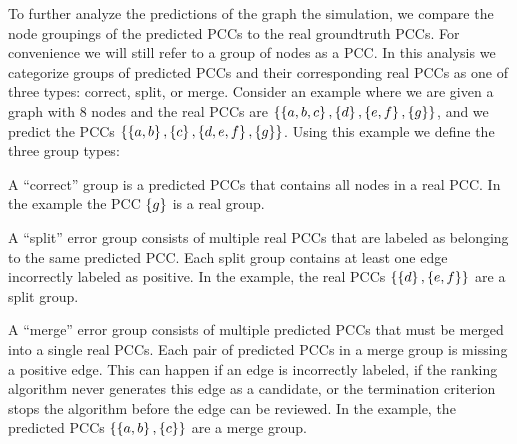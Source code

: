     To further analyze the predictions of the graph the simulation, we compare the node groupings of the
      predicted PCCs to the real groundtruth PCCs.
    For convenience we will still refer to a group of nodes as a PCC.
    In this analysis we categorize groups of predicted PCCs and their corresponding real PCCs as one of three
      types:
    correct, split, or merge.
    Consider an example where we are given a graph with $8$ nodes and the real PCCs are %
    $\left\{\left\{a, b, c\right\}, \left\{d\right\}, \left\{e, f\right\}, \left\{g\right\}\right\}$, and we predict the PCCs%
    $\left\{\left\{a, b\right\}, \left\{c\right\}, \left\{d, e, f\right\}, \left\{g\right\}\right\}$.
    Using this example we define the three group types:
    \begin{enumln}
        \item A ``correct'' group is a predicted PCCs that contains all nodes in a real PCC.
        In the example the PCC $\left\{g\right\}$ is a real group.
        
        \item A ``split'' error group consists of multiple real PCCs that are labeled as belonging to the same
          predicted PCC.
        Each split group contains at least one edge incorrectly labeled as positive.
        In the example, the real PCCs $\left\{\left\{d\right\}, \left\{e, f\right\}\right\}$ are a split group.
      
        \item A ``merge'' error group consists of multiple predicted PCCs that must be merged into a single real
          PCCs.
        Each pair of predicted PCCs in a merge group is missing a positive edge.
        This can happen if an edge is incorrectly labeled, if the ranking algorithm never generates this edge as
          a candidate, or the termination criterion stops the algorithm before the edge can be reviewed.
        In the example, the predicted PCCs $\left\{\left\{a, b\right\}, \left\{c\right\}\right\}$ are a merge group.
        
    \end{enumln}
